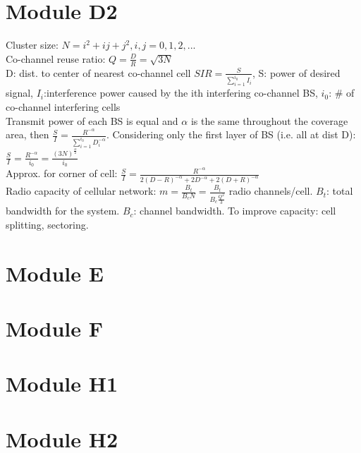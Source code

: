 \documentclass[10pt,a4paper,landscape]{article}
\begin{document}
\begin{multicols*}{4}
\section{Module D2}
Cluster size: $N = i^2 +ij + j^2, i,j=0,1,2,...$\\
Co-channel reuse ratio: $Q = \frac{D}{R} = \sqrt{3N}$\\
D: dist. to center of nearest co-channel cell
$SIR = \frac{S}{\sum\limits_{i=1}^{i_0}I_i}$, S: power of desired signal, $I_i$:interference power caused by the ith interfering co-channel BS, $i_0$: \# of co-channel interfering cells\\
Transmit power of each BS is equal and $\alpha$ is the same throughout the coverage area, then $\frac{S}{I} = \frac{R^{-\alpha}}{\sum\limits_{i=1}^{i_0}D_i^{-\alpha}}$. Considering only the first layer of BS (i.e. all at dist D): $\frac{S}{I}= \frac{R^{-\alpha}}{i_0} = \frac{(3N)^{\frac{\alpha}{2}}}{i_0}$\\
Approx. for corner of cell: $\frac{S}{I} = \frac{R^{-\alpha}}{2(D-R)^{-\alpha}+2D^{-\alpha}+2(D+R)^{-\alpha}}$\\
Radio capacity of cellular network: $m = \frac{B_t}{B_c N} = \frac{B_t}{B_c \frac{Q^2}{3}}$ radio channels/cell. $B_t$: total bandwidth for the system. $B_c$: channel bandwidth. To improve capacity: cell splitting, sectoring.\\
\section{Module E}
\subsection{}


\section{Module F}
\subsection{}


\section{Module H1}
\subsection{}


\section{Module H2}
\subsection{}

\end{multicols*}
\end{document}
